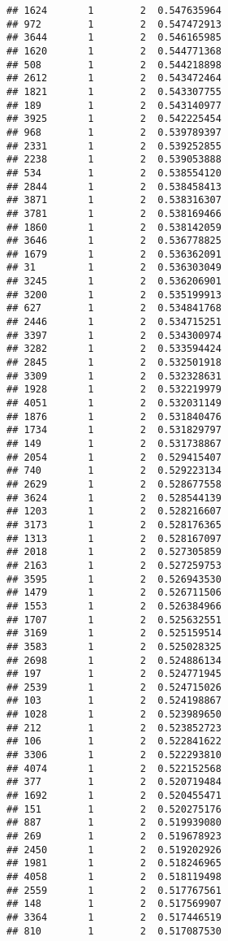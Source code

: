 \documentclass[
]{article}
\begin{document}
\begin{verbatim}
## 1624       1        2  0.547635964
## 972        1        2  0.547472913
## 3644       1        2  0.546165985
## 1620       1        2  0.544771368
## 508        1        2  0.544218898
## 2612       1        2  0.543472464
## 1821       1        2  0.543307755
## 189        1        2  0.543140977
## 3925       1        2  0.542225454
## 968        1        2  0.539789397
## 2331       1        2  0.539252855
## 2238       1        2  0.539053888
## 534        1        2  0.538554120
## 2844       1        2  0.538458413
## 3871       1        2  0.538316307
## 3781       1        2  0.538169466
## 1860       1        2  0.538142059
## 3646       1        2  0.536778825
## 1679       1        2  0.536362091
## 31         1        2  0.536303049
## 3245       1        2  0.536206901
## 3200       1        2  0.535199913
## 627        1        2  0.534841768
## 2446       1        2  0.534715251
## 3397       1        2  0.534300974
## 3282       1        2  0.533594424
## 2845       1        2  0.532501918
## 3309       1        2  0.532328631
## 1928       1        2  0.532219979
## 4051       1        2  0.532031149
## 1876       1        2  0.531840476
## 1734       1        2  0.531829797
## 149        1        2  0.531738867
## 2054       1        2  0.529415407
## 740        1        2  0.529223134
## 2629       1        2  0.528677558
## 3624       1        2  0.528544139
## 1203       1        2  0.528216607
## 3173       1        2  0.528176365
## 1313       1        2  0.528167097
## 2018       1        2  0.527305859
## 2163       1        2  0.527259753
## 3595       1        2  0.526943530
## 1479       1        2  0.526711506
## 1553       1        2  0.526384966
## 1707       1        2  0.525632551
## 3169       1        2  0.525159514
## 3583       1        2  0.525028325
## 2698       1        2  0.524886134
## 197        1        2  0.524771945
## 2539       1        2  0.524715026
## 103        1        2  0.524198867
## 1028       1        2  0.523989650
## 212        1        2  0.523852723
## 106        1        2  0.522841622
## 3306       1        2  0.522293810
## 4074       1        2  0.522152568
## 377        1        2  0.520719484
## 1692       1        2  0.520455471
## 151        1        2  0.520275176
## 887        1        2  0.519939080
## 269        1        2  0.519678923
## 2450       1        2  0.519202926
## 1981       1        2  0.518246965
## 4058       1        2  0.518119498
## 2559       1        2  0.517767561
## 148        1        2  0.517569907
## 3364       1        2  0.517446519
## 810        1        2  0.517087530

\end{verbatim}
\end{document}
